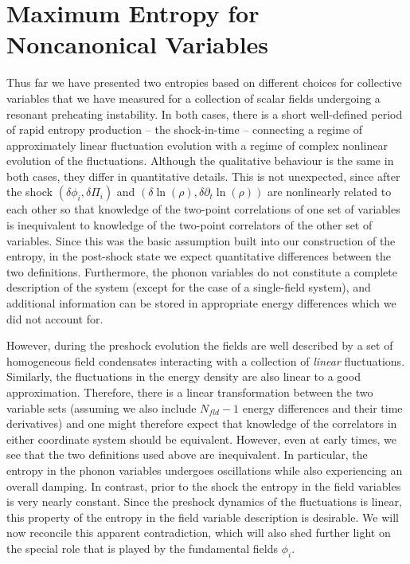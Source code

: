 \documentclass[11pt,a4paper]{article}
\begin{document}
\section{Maximum Entropy for Noncanonical Variables}
\label{sec:noncanonical_entropy}
Thus far we have presented two entropies based on different choices for collective variables that we have measured for a collection of scalar fields undergoing a resonant preheating instability.
In both cases, there is a short well-defined period of rapid entropy production -- the shock-in-time -- connecting a regime of approximately linear fluctuation evolution with a regime of complex nonlinear evolution of the fluctuations.
Although the qualitative behaviour is the same in both cases, they differ in quantitative details.
This is not unexpected, since after the shock $(\delta\phi_i,\delta\Pi_i)$ and $(\delta\ln(\rho),\delta\partial_t\ln(\rho))$ are nonlinearly related to each other
so that knowledge of the two-point correlations of one set of variables is inequivalent to knowledge of the two-point correlators of the other set of variables.
Since this was the basic assumption built into our construction of the entropy, in the post-shock state we expect quantitative differences between the two definitions.
Furthermore, the phonon variables do not constitute a complete description of the system (except for the case of a single-field system), and additional information can be stored in appropriate energy differences which we did not account for.

However, during the preshock evolution the fields are well described by a set of homogeneous field condensates interacting with a collection of \emph{linear} fluctuations.
Similarly, the fluctuations in the energy density are also linear to a good approximation.
Therefore, there is a linear transformation between the two variable sets (assuming we also include $N_{fld}-1$ energy differences and their time derivatives) and one might therefore expect that knowledge of the correlators in either coordinate system should be equivalent.
However, even at early times, we see that the two definitions used above are inequivalent.
In particular, the entropy in the phonon variables undergoes oscillations while also experiencing an overall damping.
In contrast, prior to the shock the entropy in the field variables is very nearly constant.
Since the preshock dynamics of the fluctuations is linear, this property of the entropy in the field variable description is desirable.
We will now reconcile this apparent contradiction, which will also shed further light on the special role that is played by the fundamental fields $\phi_i$.
\end{document}
